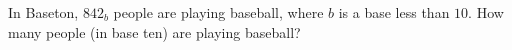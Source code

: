 In Baseton, $842_b$ people are playing baseball, where $b$ is a base less than $10$. How many people (in base ten) are playing baseball?
